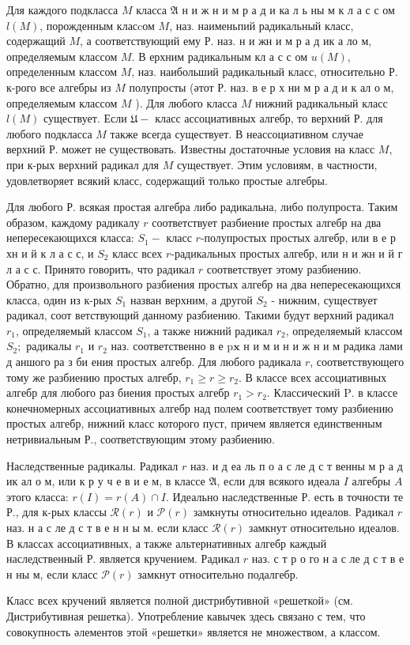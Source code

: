\documentclass[10pt]{article}
\begin{document}
Для каждого подкласса $M$ класса $\mathfrak{A}$ н и ж н и м р а д и ка л ь ны м к л а с с ом $l(M)$, порожденным класcом $M$, наз. наименьпий радикальный класс, содержащий $M$, а соответствующий ему Р. наз. н и жн и м р а д ик а ло м, определяемым классом $M$. В ерхним радикальным кл а с с ом $u(M)$, определенным классом $M$, наз. наибольший радикальный класс, относительно Р. к-рого все алгебры из $M$ полупросты (әтот Р. наз. в е р х ни м р а д и к ал о м, определяемым классом $M$ ). Для любого класса $M$ нижний радикальный класс $l(M)$ существует. Если $\mathfrak{U}-$ класс ассоциативных алгебр, то верхний Р. для любого подкласса $M$ также всегда существует. В неассоциативном случае верхний Р. может не существовать. Известны достаточные условия на класс $M$, при к-рых верхний радикал для $M$ существует. Этим условиям, в частности, удовлетворяет всякий класс, содержащий только простые алгебры.



Для любого Р. всякая простая алгебра либо радикальна, либо полупроста. Таким образом, каждому радикалу $r$ соответствует разбиение простых алгебр на два непересекающихся класса: $S_{1}-$ класс $r$-полупростых простых алгебр, или в е р хн и й к л а с с, и $S_{2}$ класс всех $r$-радикальных простых алгебр, или н и жн и й г л а с с. Принято говорить, что радикал $r$ соответствует этому разбиению. Обратно, для произвольного разбиения простых алгебр на два непересекающихся класса, один из к-рых $S_{1}$ назван верхним, а другой $S_{2}$ - нижним, существует радикал, соот ветствующий данному разбиению. Такими будут верхний радикал $r_{1}$, определяемый классом $S_{1}$, а также нижний радикал $r_{2}$, определяемый классом $S_{2} ;$ радикалы $r_{1}$ и $r_{2}$ наз. соответственно в е $\mathrm{p} \mathbf{x}$ н и м и н и ж н и м радика лами д аншого ра з би ения простых алгебр. Для любого радикала $r$, соответствующего тому же разбиению простых алгебр, $r_{1} \geqslant r \geqslant r_{2}$. В классе всех ассоциативных алгебр для любого раз биения простых алгебр $r_{1}>r_{2}$. Классический $\mathrm{P}$. в классе конечномерных ассоциативных алгебр над полем соответствует тому разбиению простых алгебр, нижний класс которого пуст, причем является единственным нетривиальным Р., соответствующим этому разбиению.



Наследственные радикалы. Радикал $r$ наз. и д еа ль п о а с ле д с т венны м р а д ик ал о м, или к р у ч е в и е м, в классе $\mathfrak{A}$, если для всякого идеала $I$ алгебры $A$ этого класса: $r(I)=r(A) \cap I$. Идеально наследственные Р. есть в точности те Р., для к-рых классы $\mathscr{R}(r)$ и $\mathscr{P}(r)$ замкнуты относительно идеалов. Радикал $r$ наз. н а с ле д с т в е н н ы м. если класс $\mathscr{R}(r)$ замкнут относительно идеалов. В классах ассоциативных, а также альтернативных алгебр каждый наследственный Р. является кручением. Радикал $r$ наз. с т р о го н а с ле д с т в е н ны м, если класс $\mathscr{P}(r)$ замкнут относительно подалгебр.



Класс всех кручений является полной дистрибутивной «решеткой» (см. Дистрибутивная решетка). Употребление кавычек здесь связано с тем, что совокупность әлементов этой «решетки» является не множеством, а классом.
\end{document}
